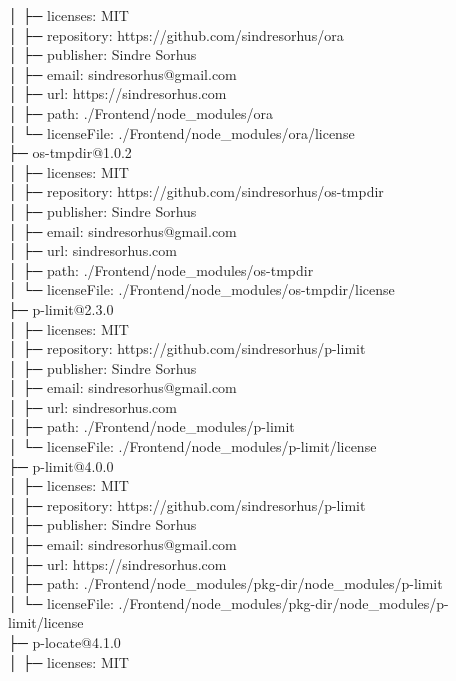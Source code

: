 │  ├─ licenses: MIT\\
│  ├─ repository: https://github.com/sindresorhus/ora\\
│  ├─ publisher: Sindre Sorhus\\
│  ├─ email: sindresorhus@gmail.com\\
│  ├─ url: https://sindresorhus.com\\
│  ├─ path: ./Frontend/node\_modules/ora\\
│  └─ licenseFile: ./Frontend/node\_modules/ora/license\\
├─ os-tmpdir@1.0.2\\
│  ├─ licenses: MIT\\
│  ├─ repository: https://github.com/sindresorhus/os-tmpdir\\
│  ├─ publisher: Sindre Sorhus\\
│  ├─ email: sindresorhus@gmail.com\\
│  ├─ url: sindresorhus.com\\
│  ├─ path: ./Frontend/node\_modules/os-tmpdir\\
│  └─ licenseFile: ./Frontend/node\_modules/os-tmpdir/license\\
├─ p-limit@2.3.0\\
│  ├─ licenses: MIT\\
│  ├─ repository: https://github.com/sindresorhus/p-limit\\
│  ├─ publisher: Sindre Sorhus\\
│  ├─ email: sindresorhus@gmail.com\\
│  ├─ url: sindresorhus.com\\
│  ├─ path: ./Frontend/node\_modules/p-limit\\
│  └─ licenseFile: ./Frontend/node\_modules/p-limit/license\\
├─ p-limit@4.0.0\\
│  ├─ licenses: MIT\\
│  ├─ repository: https://github.com/sindresorhus/p-limit\\
│  ├─ publisher: Sindre Sorhus\\
│  ├─ email: sindresorhus@gmail.com\\
│  ├─ url: https://sindresorhus.com\\
│  ├─ path: ./Frontend/node\_modules/pkg-dir/node\_modules/p-limit\\
│  └─ licenseFile: ./Frontend/node\_modules/pkg-dir/node\_modules/p-limit/license\\
├─ p-locate@4.1.0\\
│  ├─ licenses: MIT\\
